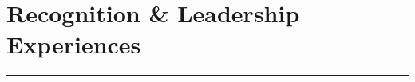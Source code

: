 \documentclass[letterpaper,10pt]{article}
\begin{document}
  \begin{comment}
  
\begin{itemize}[label=$\blacktriangleright$]

	\item \emph{Graduate Part-Time Instructor} PHYS 1403/1404: Algebra-based, Inquiry-based, Laboratory-based Introductory Physics Curriculum. TTU, 2017-Present.  
	
	

	
\item \emph{Teaching Assistant.}  PHYS 1401/2401: Principles of Physics I/II. Lead the laboratories and discussions for the calculus based introductory physics. TTU, 2016-2017.  
  	  

  \item \emph{Undergraduate Teaching Fellow.}  PHYS 2215: Physics for Scientists and Engineers Lab I -  Utah State, Fall 2013.
  
  
  
  
 
  
  
  \end{itemize}
  
  
  
  
  
  
  
  
  




\end{comment}



\section*{Recognition \& Leadership Experiences }       

\hrule
\vspace{.3 cm}
\end{document}
